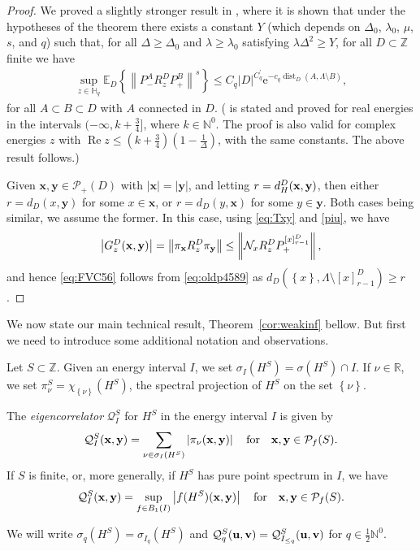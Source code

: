 \documentclass[12pt, a4paper,reqno]{amsart}
\numberwithin{equation}{section}
\DeclareMathOperator{\dist}{dist}
\DeclareMathOperator{\Rea}{Re}
\newcommand\R{\mathbb R}
\newcommand\N{\mathbb N}
\newcommand\Z{\mathbb Z}
\newcommand\x{\mathbf{x}}
\newcommand\y{\mathbf{y}}
\newcommand\e{\mathrm{e}}
\newcommand\E{\mathbb E}
\newcommand\cN{\mathcal{N}}
\newcommand\cQ{\mathcal{Q}}
\newcommand\cP{\mathcal{P}}
\newcommand{\pr}{\prime}
\newcommand\be{\begin{equation}\begin{aligned}}
\newcommand\ee{\end{aligned}\end{equation}}
\newcommand{\abs}[1]{\left\lvert #1 \right\rvert}
\newcommand{\norm}[1]{\left\lVert #1 \right\rVert}
\newcommand{\set}[1]{\left\{ #1 \right\}}
\newcommand{\pa}[1]{\left( #1 \right)}
\newcommand\La{\Lambda}
\newcommand{\eq}[1]{\eqref{#1}}
\newcommand{\qtx}[1]{\quad\text{#1}\quad}
\newcommand{\nfd}{\pa{1- \frac{1}{\Delta}}}
\begin{document}
\begin{proof}
We proved a slightly stronger result  in  \cite[Theorem 2.4]{EK22}, where it is shown that under the hypotheses
of the theorem there exists a constant $Y$ (which depends on $\Delta_0$, $\lambda_0$,  $\mu$, $s$, and $q$) such that, 
 for all $\Delta \ge \Delta_0$ and $\lambda\ge \lambda_0$ satisfying  $\lambda \Delta^2\ge Y$, for all $D\subset \Z$ finite  we have 
\be\label{eq:oldp4589}
\sup_{z\in\mathds{H}_q} \E_D\set{\norm{ P_-^AR^{D}_{z}P_+^B}^s}\le C_q\abs{D}^{C^\pr_q}    \e^{-c_q\dist_D\pa{A,\La \setminus B}},      
\ee
for all  $A\subset B\subset D$ with    $A$ connected in $D$. ({\cite[Theorem 2.4]{EK22}  is stated and proved  for real energies in the  intervals $(-\infty, k+\tfrac 3 4]$, 
 where $k\in \N^0$. The  proof  is also valid for complex energies $z$ with  $ \Rea z  \le (k+\tfrac 3 4)\nfd$, with the same constants.  The above result follows.)}



Given     $\x, \y \in \cP_+ (D)$  with $\abs{\x}=\abs{\y}$, and letting  $r=d_H^D ({\bf x},{\bf y})$,  then either $r=d_D (x, \y)$   for some $x \in \x$, or  $r=d_D (y, \x)$   for some $y \in \y$.  Both cases being similar, we assume the former. In this case, using \eq{eq:Txy} and  \eq{piu}, we have
\be
\abs{G^{D}_{z}({\bf x},{\bf y})}= \norm{\pi_{\x} R_z^D \pi_{\y}}\le  \norm{ \cN_x R_z^D  P_+^{[x]^D_{r-1}}},
\ee
and hence \eqref{eq:FVC56} follows from  \eqref{eq:oldp4589}  as  
   $d_D\pa{\set{x},\La \setminus {[x]^D_{r-1}}}\ge  r$.  
\end{proof}
 We now state our main technical result, Theorem~\ref{cor:weakinf} bellow. But first we need to introduce some  additional notation  and observations.

 Let $S\subset \Z$.  Given an energy interval $I$, we set $\sigma_I(H^S)=\sigma(H^S)\cap I$.
If  $\nu \in \R$, we set $\pi^S_\nu= \chi_{\set{\nu}} (H^S)$, the spectral projection  of $H^S$ on the set $\set{\nu}$.  

The {\it eigencorrelator}  $\cQ^S_I$ for $H^S$  in the energy interval $I$ is given by 
\be\label{eq:eigcor}
\cQ^S_I({\bf x},{\bf y}) =  \sum_{\nu\in\sigma_I (H^S) }\abs{\pi_{\nu} (\x,\y)}\qtx{for} {\bf x},{\bf y}\in \cP_f(S).
\ee
If $S$ is finite, or, more generally, if $H^S$ has pure point spectrum in $I$, we have 
\be\label{eq:eigcor33}
\cQ^S_I({\bf x},{\bf y})=\sup_{f\in B_1(I)}\abs{f(H^S) ({\bf x},{\bf y})} \qtx{for} {\bf x},{\bf y}\in \cP_f(S).
\ee

We will write   $\sigma_q(H^S)=\sigma_{I_q}(H^S)$  and
$ \cQ^S_q ({\bf u},{\bf v}) =\cQ^S_{I_{\le q}}({\bf u},{\bf v})$ for $q\in \frac 12 \N^0$.
\end{document}
